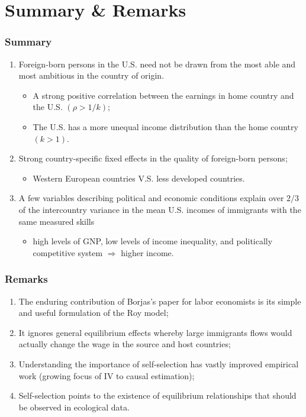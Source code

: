 \documentclass[10pt]{beamer}
\begin{document}
\section[Summary]{Summary \& Remarks}
\begin{frame}[c]\frametitle{Summary}
\begin{enumerate}
    \item Foreign-born persons in the U.S. need not be drawn from the most able and most ambitious in the country of origin.
    \begin{itemize}
        \item A strong positive correlation between the earnings in home country and the U.S. $(\rho > 1/k)$;
        \item The U.S. has a more unequal income distribution than the home country $(k>1)$.
    \end{itemize}
    \item  Strong country-specific fixed effects in the quality of foreign-born persons;
    \begin{itemize}
        \item Western European countries V.S. less developed countries.
    \end{itemize}
    \item A few variables describing political and economic conditions explain over $2/3$ of the intercountry variance in the mean U.S. incomes of immigrants with the same measured skills
    \begin{itemize}
        \item  high levels of GNP, low levels of income inequality, and politically competitive system $\Rightarrow$ higher income.
    \end{itemize}
\end{enumerate}

\end{frame}

\begin{frame}[c]\frametitle{Remarks}

\begin{enumerate}
    \item The enduring contribution of Borjas\rq{}s paper for labor economists is its \alert{simple and useful formulation of the Roy model};
    \item It \alert{ignores general equilibrium effects} whereby large immigrants flows would actually change the wage in the source and host countries;
    \item Understanding the importance of self-selection has vastly improved empirical work (growing focus of \alert{IV to causal estimation});
    \item Self-selection points to the existence of \alert{equilibrium relationships} that should be observed in ecological data.
\end{enumerate}


\end{frame}
\end{document}
